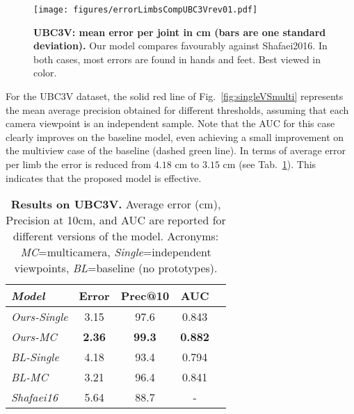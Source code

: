 \documentclass[review,12pt,3p]{elsarticle}
\begin{document}
\begin{figure}[tb]
\centering
   \texttt{[image: figures/errorLimbsCompUBC3Vrev01.pdf]}
   \caption{\textbf{UBC3V: mean error per joint in cm (bars are one standard deviation).} Our model compares favourably against Shafaei2016. In both cases, most errors are found in hands and feet. Best viewed in color.}
   \label{fig:jointsErrorCNN}
\end{figure}
For the UBC3V dataset, the solid red line of Fig.~\ref{fig:singleVSmulti} represents the mean average precision obtained for different thresholds, assuming that each camera viewpoint is an independent sample. Note that the AUC for this case clearly improves on the baseline model, even achieving a small improvement on the multiview case of the baseline (dashed green line). In terms of average error per limb the error is reduced from $4.18$ cm to $3.15$ cm (see Tab.~\ref{tab:resCompUBC3V}). This indicates that the proposed model is effective.

\begin{table}[tbh]
\caption{\textbf{Results on UBC3V.} Average error (cm), Precision at 10cm, and AUC are reported for different versions of the model. Acronyms: \textit{MC}=multicamera, \textit{Single}=independent viewpoints, \textit{BL}=baseline (no prototypes). 
}
\label{tab:resCompUBC3V}
\footnotesize
\begin{center}
\setlength{\tabcolsep}{0.2em} %
\begin{tabular}{|l|c|c|c|c|}
\hline 
\textit{Model} & Error & Prec@10 & AUC \\ 
\hline \hline
\textit{Ours-Single} &3.15 & 97.6 & 0.843\\
\textit{Ours-MC} &  \textbf{2.36} & \textbf{99.3} & \textbf{0.882}\\
\hline
\textit{BL-Single} & 4.18 & 93.4  & 0.794\\ %
\textit{BL-MC}  & 3.21 & 96.4 & 0.841\\ %
\hline
\textit{Shafaei16} & 5.64 & 88.7 & - \\
\hline 
\end{tabular} 
\end{center}
\end{table}
\end{document}
